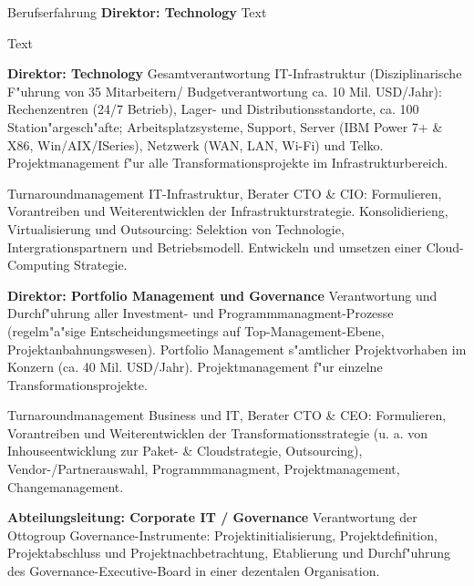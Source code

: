 \begin{rubric}{Berufserfahrung}
\entry*[08/2015 - heute] \textbf{Direktor: Technology}\newline
{} 
Text

Text

\entry*[04/2013 - 08/2015] \textbf{Direktor: Technology}\newline
{} 
Gesamtverantwortung IT-Infrastruktur (Disziplinarische F"uhrung von 35 Mitarbeitern/ Budgetverantwortung ca. 10 Mil. USD/Jahr): Rechenzentren (24/7 Betrieb), Lager- und Distributionsstandorte, ca. 100 Station"argesch"afte; Arbeitsplatzsysteme, Support, Server (IBM Power 7+ \& X86, Win/AIX/ISeries), Netzwerk (WAN, LAN, Wi-Fi) und Telko. Projektmanagement f"ur alle Transformationsprojekte im Infrastrukturbereich.

Turnaroundmanagement IT-Infrastruktur, Berater CTO \& CIO: Formulieren, Vorantreiben und Weiterentwicklen der Infrastrukturstrategie. Konsolidierieng, Virtualisierung und Outsourcing: Selektion von Technologie, Intergrationspartnern und Betriebsmodell. Entwickeln und umsetzen einer Cloud-Computing Strategie.

\entry*[10/2011 - 03/2013] \textbf{Direktor: Portfolio Management und Governance}\newline
{} 
Verantwortung und Durchf"uhrung aller Investment- und Programmmanagment-Prozesse (regelm"a"sige Entscheidungsmeetings auf Top-Management-Ebene, Projektanbahnungswesen). Portfolio Management s"amtlicher Projektvorhaben im Konzern (ca. 40 Mil. USD/Jahr). Projektmanagement f"ur einzelne Transformationsprojekte.\axelvspace

Turnaroundmanagement Business und IT, Berater CTO \& CEO: Formulieren, Vorantreiben und Weiterentwicklen der Transformationsstrategie (u. a. von Inhouseentwicklung zur Paket- \& Cloudstrategie, Outsourcing), Vendor-/Partnerauswahl, Programmmanagment, Projektmanagement, Changemanagement.\newline

\pagebreak
{}
\entry*[08/2009 - 10/2011] \textbf{Abteilungsleitung: Corporate IT / Governance}\newline
{} 
Verantwortung der Ottogroup Governance-Instrumente: Projektinitialisierung, Projektdefinition, Projektabschluss und Projektnachbetrachtung, Etablierung und Durchf"uhrung des Governance-Executive-Board in einer dezentalen Organisation.\axelvspace


\end{rubric}
